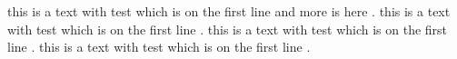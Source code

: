this is a text with test \cite{line1} which is on the first line \cite{line11,line111} and more is here \cite{line3,line33,line333,line3333}.
this is a text with test \cite{coffee3} which is on the first line \cite{coffee33,coffee333}.
this is a text with test \cite{dogger1} which is on the first line \cite{dogger11,dogger111}.
this is a text with test \cite{mega2} which is on the first line \cite{mega22,mega222}.
